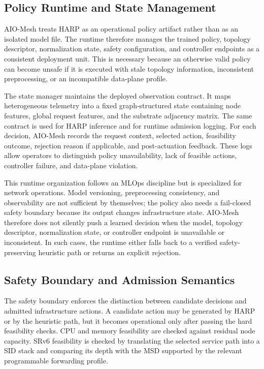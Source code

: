 \documentclass[final,5p]{elsarticle}
\begin{document}
\subsection{Policy Runtime and State Management}
\label{subsec:policy_runtime}

AIO-Mesh treats HARP as an operational policy artifact rather than as an isolated model file. The runtime therefore manages the trained policy, topology descriptor, normalization state, safety configuration, and controller endpoints as a consistent deployment unit. This is necessary because an otherwise valid policy can become unsafe if it is executed with stale topology information, inconsistent preprocessing, or an incompatible data-plane profile.

The state manager maintains the deployed observation contract. It maps heterogeneous telemetry into a fixed graph-structured state containing node features, global request features, and the substrate adjacency matrix. The same contract is used for HARP inference and for runtime admission logging. For each decision, AIO-Mesh records the request context, selected action, feasibility outcome, rejection reason if applicable, and post-actuation feedback. These logs allow operators to distinguish policy unavailability, lack of feasible actions, controller failure, and data-plane violation.

This runtime organization follows an MLOps discipline but is specialized for network operations. Model versioning, preprocessing consistency, and observability are not sufficient by themselves; the policy also needs a fail-closed safety boundary because its output changes infrastructure state. AIO-Mesh therefore does not silently push a learned decision when the model, topology descriptor, normalization state, or controller endpoint is unavailable or inconsistent. In such cases, the runtime either falls back to a verified safety-preserving heuristic path or returns an explicit rejection.

\subsection{Safety Boundary and Admission Semantics}
\label{subsec:safety_boundary}

The safety boundary enforces the distinction between candidate decisions and admitted infrastructure actions. A candidate action may be generated by HARP or by the heuristic path, but it becomes operational only after passing the hard feasibility checks. CPU and memory feasibility are checked against residual node capacity. SRv6 feasibility is checked by translating the selected service path into a SID stack and comparing its depth with the MSD supported by the relevant programmable forwarding profile.
\end{document}
